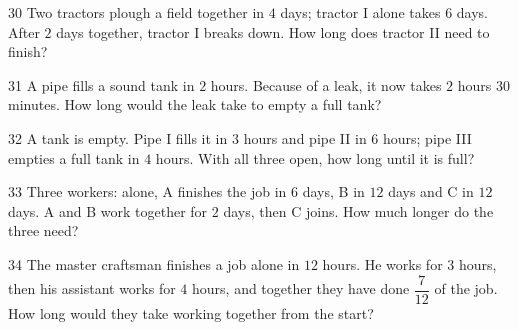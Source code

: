 \gap
\begin{probbox}{30}{\relax}
Two tractors plough a field together in $4$ days; tractor I alone takes $6$ days. After $2$ days together, tractor I breaks down. How long does tractor II need to finish?
\end{probbox}
\begin{probbox}{31}{}
A pipe fills a sound tank in $2$ hours. Because of a leak, it now takes $2$ hours $30$ minutes. How long would the leak take to empty a full tank?
\end{probbox}
\gap
\begin{probbox}{32}{}
A tank is empty. Pipe I fills it in $3$ hours and pipe II in $6$ hours; pipe III empties a full tank in $4$ hours. With all three open, how long until it is full?
\end{probbox}
\gap
\begin{probbox}{33}{}
Three workers: alone, A finishes the job in $6$ days, B in $12$ days and C in $12$ days. A and B work together for $2$ days, then C joins. How much longer do the three need?
\end{probbox}
\gap
\begin{probbox}{34}{}
The master craftsman finishes a job alone in $12$ hours. He works for $3$ hours, then his assistant works for $4$ hours, and together they have done $\dfrac7{12}$ of the job. How long would they take working together from the start?
\end{probbox}
